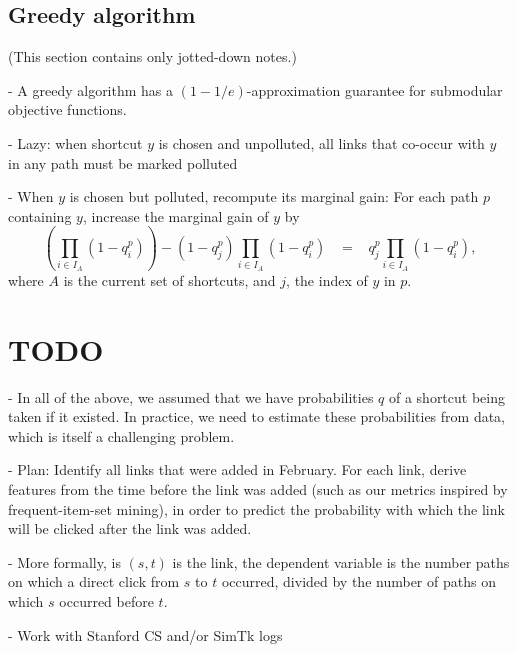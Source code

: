\documentclass[11pt,letterpaper]{article}
\begin{document}
\subsection{Greedy algorithm}

(This section contains only jotted-down notes.)

- A greedy algorithm has a $(1-1/e)$-approximation guarantee for submodular objective functions.

- Lazy: when shortcut $y$ is chosen and unpolluted, all links that co-occur with $y$ in any path must be marked polluted

- When $y$ is chosen but polluted, recompute its marginal gain: For each path $p$ containing $y$, increase the marginal gain of $y$ by 
$$\left(\prod_{i \in I_A} \left( 1 - q^p_i \right)\right) - (1 - q^p_j) \prod_{i \in I_A} \left( 1 - q^p_i \right)
\;\;\;=\;\;\; q^p_j \prod_{i \in I_A} \left( 1 - q^p_i \right),$$
where $A$ is the current set of shortcuts, and $j$, the index of $y$ in $p$.


\section{TODO}

- In all of the above, we assumed that we have probabilities $q$ of a shortcut being taken if it existed.
In practice, we need to estimate these probabilities from data, which is itself a challenging problem.

- Plan: Identify all links that were added in February. For each link, derive features from the time before the link was added (such as our metrics inspired by frequent-item-set mining), in order to predict the probability with which the link will be clicked after the link was added.

- More formally, is $(s,t)$ is the link, the dependent variable is the number paths on which a direct click from $s$ to $t$ occurred, divided by the number of paths on which $s$ occurred before $t$.

- Work with Stanford CS and/or SimTk logs
\end{document}
